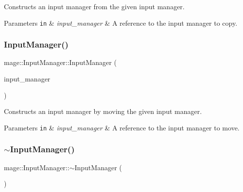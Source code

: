 Constructs an input manager from the given input manager.


\begin{DoxyParams}[1]{Parameters}
\mbox{\tt in}  & {\em input\+\_\+manager} & A reference to the input manager to copy. \\
\hline
\end{DoxyParams}
\hypertarget{classmage_1_1_input_manager_a93de208333f18b4c61ec72d0a28d0d51}{}\label{classmage_1_1_input_manager_a93de208333f18b4c61ec72d0a28d0d51} 
\subsubsection{\texorpdfstring{Input\+Manager()}{InputManager()}\hspace{0.1cm}{\footnotesize\ttfamily [3/3]}}
{\footnotesize\ttfamily mage\+::\+Input\+Manager\+::\+Input\+Manager (\begin{DoxyParamCaption}\item[{\hyperlink{classmage_1_1_input_manager}{Input\+Manager} \&\&}]{input\+\_\+manager }\end{DoxyParamCaption})\hspace{0.3cm}{\ttfamily [default]}}

Constructs an input manager by moving the given input manager.


\begin{DoxyParams}[1]{Parameters}
\mbox{\tt in}  & {\em input\+\_\+manager} & A reference to the input manager to move. \\
\hline
\end{DoxyParams}
\hypertarget{classmage_1_1_input_manager_afb025b87d9448365593bab11e6e775a2}{}\label{classmage_1_1_input_manager_afb025b87d9448365593bab11e6e775a2} 
\subsubsection{\texorpdfstring{$\sim$\+Input\+Manager()}{~InputManager()}}
{\footnotesize\ttfamily mage\+::\+Input\+Manager\+::$\sim$\+Input\+Manager (\begin{DoxyParamCaption}{ }\end{DoxyParamCaption})\hspace{0.3cm}{\ttfamily [default]}}

